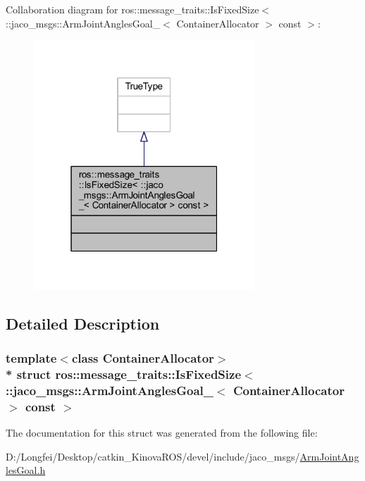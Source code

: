 Collaboration diagram for ros\+:\+:message\+\_\+traits\+:\+:Is\+Fixed\+Size$<$ \+:\+:jaco\+\_\+msgs\+:\+:Arm\+Joint\+Angles\+Goal\+\_\+$<$ Container\+Allocator $>$ const $>$\+:
\nopagebreak
\begin{figure}[H]
\begin{center}
\leavevmode
\includegraphics[width=235pt]{d4/d3e/structros_1_1message__traits_1_1IsFixedSize_3_01_1_1jaco__msgs_1_1ArmJointAnglesGoal___3_01Contae92af5435de7f91253618f009a92c5b6}
\end{center}
\end{figure}


\subsection{Detailed Description}
\subsubsection*{template$<$class Container\+Allocator$>$\\*
struct ros\+::message\+\_\+traits\+::\+Is\+Fixed\+Size$<$ \+::jaco\+\_\+msgs\+::\+Arm\+Joint\+Angles\+Goal\+\_\+$<$ Container\+Allocator $>$ const  $>$}



The documentation for this struct was generated from the following file\+:\begin{DoxyCompactItemize}
\item 
D\+:/\+Longfei/\+Desktop/catkin\+\_\+\+Kinova\+R\+O\+S/devel/include/jaco\+\_\+msgs/\hyperlink{ArmJointAnglesGoal_8h}{Arm\+Joint\+Angles\+Goal.\+h}\end{DoxyCompactItemize}
